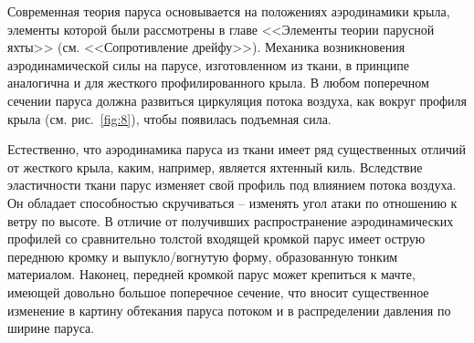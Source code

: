 \documentclass[a4paper, 12pt, twoside, final, book, russian, fittopage, cyremdash]{ncc}
\newcommand{\ris}[1]{\ref{fig:#1}}
\begin{document}
Современная теория паруса основывается на положениях аэродинамики крыла, элементы которой были рассмотрены в главе <<Элементы теории парусной яхты>> (см. <<Сопротивление дрейфу>>). Механика возникновения аэродинамической силы на парусе, изготовленном из ткани, в принципе аналогична и для жесткого профилированного крыла. В любом поперечном сечении паруса должна развиться циркуляция потока воздуха, как вокруг профиля крыла (см. рис.~\ris{8}), чтобы появилась подъемная сила.

Естественно, что аэродинамика паруса из ткани имеет ряд существенных отличий от жесткого крыла, каким, например, является яхтенный киль. Вследствие эластичности ткани парус изменяет свой профиль под влиянием потока воздуха. Он обладает способностью скручиваться \--- изменять угол атаки по отношению к ветру по высоте. В отличие от получивших распространение аэродинамических профилей со сравнительно толстой входящей кромкой парус имеет острую переднюю кромку и выпукло\-/вогнутую форму, образованную тонким материалом. Наконец, передней кромкой парус может крепиться к мачте, имеющей довольно большое поперечное сечение, что вносит существенное изменение в картину обтекания паруса потоком и в распределении давления по ширине паруса.
\end{document}
